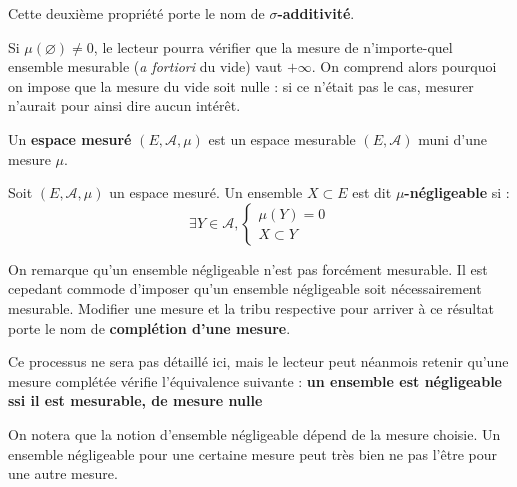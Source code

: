 \documentclass[../integ-proba.tex]{subfiles}
\begin{document}
  \begin{rem}
    Cette deuxième propriété porte le nom de $\sigma$\textbf{-additivité}.
  \end{rem}

  \begin{rem}
    Si $\mu(\varnothing) \neq 0$, le lecteur pourra vérifier que la mesure de n'importe-quel ensemble mesurable (\textit{a fortiori} du vide) vaut $+\infty$.
    On comprend alors pourquoi on impose que la mesure du vide soit nulle : si ce n'était pas le cas, mesurer n'aurait pour ainsi dire aucun intérêt.
  \end{rem}

  \begin{defi}
    Un \textbf{espace mesuré} $\left(E, \mathcal{A}, \mu\right)$ est un espace mesurable $\left(E, \mathcal{A}\right)$ muni d'une mesure $\mu$.
  \end{defi}

  \begin{defi}
    Soit $\left(E, \mathcal{A}, \mu\right)$ un espace mesuré.
    Un ensemble $X \subset E$ est dit $\mu$\textbf{-négligeable} si :
    \begin{displaymath}
      \exists Y \in \mathcal{A},
    \left\{
      \begin{array}{c}
        \mu(Y)=0\\
        X \subset Y
      \end{array}
      \right.
    \end{displaymath}
  \end{defi}

  \begin{rem}
    \label{rem:completion}
    On remarque qu'un ensemble négligeable n'est pas forcément mesurable.
    Il est cepedant commode d'imposer qu'un ensemble négligeable soit nécessairement mesurable.
    Modifier une mesure et la tribu respective pour arriver à ce résultat porte le nom de \textbf{complétion d'une mesure}.

    Ce processus ne sera pas détaillé ici, mais le lecteur peut néanmois retenir qu'une mesure complétée vérifie l'équivalence suivante : \textbf{un ensemble est négligeable ssi il est mesurable, de mesure nulle}
  \end{rem}

  \begin{rem}
    On notera que la notion d'ensemble négligeable dépend de la mesure choisie.
    Un ensemble négligeable pour une certaine mesure peut très bien ne pas l'être pour une autre mesure.
  \end{rem}
\end{document}
